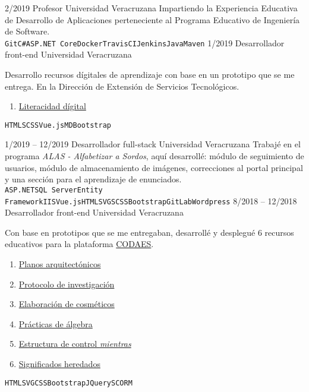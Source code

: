 \documentclass[9pt]{developercv} %
\begin{document}
\begin{entrylist}
    \entry
		{2/2019}
		{Profesor}
		{Universidad Veracruzana}
        {Impartiendo la Experiencia Educativa de Desarrollo de Aplicaciones perteneciente al Programa Educativo de Ingeniería de Software.\\
        \texttt{Git}\slashsep\texttt{C\#}\slashsep\texttt{ASP.NET Core}\slashsep\texttt{Docker}\slashsep\texttt{TravisCI}\slashsep\texttt{Jenkins}\slashsep\texttt{Java}\slashsep\texttt{Maven}}
	\entry
		{1/2019}
		{Desarrollador front-end}
		{Universidad Veracruzana}
        {Desarrollo recursos dígitales de aprendizaje con base en un prototipo que se me entrega. En la Dirección de Extensión de Servicios Tecnológicos.
        \begin{enumerate}
            \item \href{https://www.uv.mx/celulaode/literacidaddigital/}{Literacidad dígital}
        \end{enumerate}
        \texttt{HTML}\slashsep\texttt{SCSS}\slashsep\texttt{Vue.js}\slashsep\texttt{MDBootstrap}}
	\entry
		{1/2019 -- 12/2019}
		{Desarrollador full-stack}
		{Universidad Veracruzana}
        {Trabajé en el programa \textit{ALAS - Alfabetizar a Sordos}, aquí desarrollé: módulo de seguimiento de usuarios, módulo de almacenamiento de imágenes, correcciones al portal principal y una sección para el aprendizaje de enunciados. \\
        \texttt{ASP.NET}\slashsep\texttt{SQL Server}\slashsep\texttt{Entity Framework}\slashsep\texttt{IIS}\slashsep\texttt{Vue.js}\slashsep\texttt{HTML}\slashsep\texttt{SVG}\slashsep\texttt{SCSS}\slashsep\texttt{Bootstrap}\slashsep\texttt{GitLab}\slashsep\texttt{Wordpress}}
	\entry
		{8/2018 -- 12/2018}
		{Desarrollador front-end}
		{Universidad Veracruzana}
        {Con base en prototipos que se me entregaban, desarrollé y desplegué 6 recursos educativos para la plataforma \href{https://www.codaes.mx}{CODAES}.
        \begin{enumerate}
            \item \href{https://www.uv.mx/celulaode/PlanosArquitectonicos/}{Planos arquitectónicos}
            \item \href{https://www.uv.mx/celulaode/ProtocoloInvestigacion/}{Protocolo de investigación}
            \item \href{https://www.uv.mx/celulaode/ElaboracionCosmeticos/}{Elaboración de cosméticos}
            \item \href{https://www.uv.mx/celulaode/PracticasAlgebra/}{Prácticas de álgebra}
            \item \href{https://www.uv.mx/celulaode/EstructuraMientras/}{Estructura de control \textit{mientras}}
            \item \href{https://www.uv.mx/celulaode/SignificadosHeredados/}{Significados heredados}
        \end{enumerate}
        \texttt{HTML}\slashsep\texttt{SVG}\slashsep\texttt{CSS}\slashsep\texttt{Bootstrap}\slashsep\texttt{JQuery}\slashsep\texttt{SCORM}}
\end{entrylist}
\end{document}
